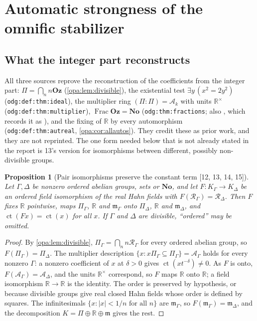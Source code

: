 \documentclass[11pt,oneside]{article}
\numberwithin{equation}{section}
\newtheorem{proposition}[proposition]{Proposition}
\theoremstyle{definition}
\theoremstyle{remark}
\newcommand{\No}{\mathbf{No}}
\newcommand{\Oz}{\mathbf{Oz}}
\newcommand{\R}{\mathbb R}
\newcommand{\Ak}{\mathcal A_k}
\newcommand{\mm}{\mathfrak m}
\newcommand{\ct}{\operatorname{ct}}
\newcommand{\Frac}{\operatorname{Frac}}
\newcommand{\src}[1]{\textup{\textsf{\small[#1]}}}
\newcommand{\lbl}[1]{\nolinkurl{#1}}
\begin{document}
\section{Automatic strongness of the omnific stabilizer}\label{opa:as:sec:auto}

\subsection{What the integer part reconstructs}

All three sources reprove the reconstruction of the coefficients from the integer part:
$\Pi=\bigcap_nn\Oz$ (\cref{opa:lem:divisible}), the existential test
$\exists y\,(x^2=2y^2)$ (\lbl{odg:def:thm:ideal}), the multiplier ring $(\Pi:\Pi)=\Ak$ with
units $\R^\times$ (\lbl{odg:def:thm:multiplier}), $\Frac\Oz=\No$ (\lbl{odg:thm:fractions};
also \cite[Proposition 2.4.5]{LM}, which records it as \cite[Theorem 32]{Conway}), and the
fixing of $\R$ by every automorphism (\lbl{odg:def:thm:autreal}, \cref{opa:cor:allautos}).
They credit these as prior work, and they are not reprinted. The one form needed below
that is not already stated in the report is 13's version for isomorphisms between
different, possibly non-divisible groups.

\begin{proposition}[Pair isomorphisms preserve the constant term \src{12, 13, 14, 15}]\label{opa:as:prop:setpairs}
Let $\Gamma,\Delta$ be nonzero ordered abelian groups, sets or $\No$, and let
$F:K_\Gamma\to K_\Delta$ be an ordered field isomorphism of the real Hahn fields with
$F(\mathcal R_\Gamma)=\mathcal R_\Delta$. Then $F$ fixes $\R$ pointwise, maps $\Pi_\Gamma$,
$\R$ and $\mm_\Gamma$ onto $\Pi_\Delta$, $\R$ and $\mm_\Delta$, and $\ct(Fx)=\ct(x)$ for all
$x$. If $\Gamma$ and $\Delta$ are divisible, ``ordered'' may be omitted.
\end{proposition}
\begin{proof}
By \cref{opa:lem:divisible}, $\Pi_\Gamma=\bigcap_nn\mathcal R_\Gamma$ for every ordered
abelian group, so $F(\Pi_\Gamma)=\Pi_\Delta$. The multiplier description
$\{x:x\Pi_\Gamma\subseteq\Pi_\Gamma\}=\mathcal A_\Gamma$ holds for every nonzero $\Gamma$: a
nonzero coefficient of $x$ at $\delta>0$ gives $\ct(xt^{-\delta})\ne0$. As $F$ is onto,
$F(\mathcal A_\Gamma)=\mathcal A_\Delta$, and the units $\R^\times$ correspond, so $F$ maps
$\R$ onto $\R$; a field isomorphism $\R\to\R$ is the identity. The order is preserved by
hypothesis, or because divisible groups give real closed Hahn fields whose order is
defined by squares. The infinitesimals $\{x:|x|<1/n\text{ for all }n\}$ are $\mm_\Gamma$,
so $F(\mm_\Gamma)=\mm_\Delta$, and the decomposition $K=\Pi\oplus\R\oplus\mm$ gives the
rest.
\end{proof}
\end{document}
